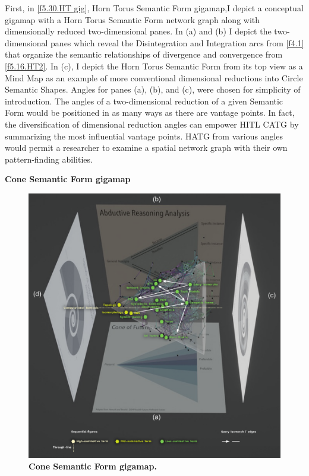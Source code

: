 First, in \autoref{f5.30.HT gig}, Horn Torus Semantic Form gigamap,I depict a conceptual gigamap with a Horn Torus Semantic Form network graph along with dimensionally reduced two-dimensional panes. In (a) and (b) I depict the two-dimensional panes which reveal the Disintegration and Integration arcs from \autoref{f4.1} that organize the semantic relationships of divergence and convergence from \autoref{f5.16.HT2}. In (c), I depict the Horn Torus Semantic Form from its top view as a Mind Map \citep{buzan_ultimate_2005} as an example of more conventional dimensional reductions into Circle Semantic Shapes. Angles for panes (a), (b), and (c), were chosen for simplicity of introduction. The angles of a two-dimensional reduction of a given Semantic Form would be positioned in as many ways as there are vantage points. In fact, the diversification of dimensional reduction angles can empower HITL CATG by summarizing the most influential vantage points. HATG  from various angles would permit a researcher to examine a spatial network graph with their own pattern-finding abilities.




\noindent  \textbf{Cone Semantic Form gigamap}
\\
\FloatBarrier  
\begin{figure}[h!]
    \centering
    \includegraphics[width=\textwidth]{figures/5.31.Cone gig.png}
    \caption[Spatial gigamap around Cone Semantic Form network graph about Query Isomorph \textit{i}]{\textbf{Cone Semantic Form gigamap.}}
    \label{f5.31.Cone gig}
\end{figure}
\FloatBarrier  

